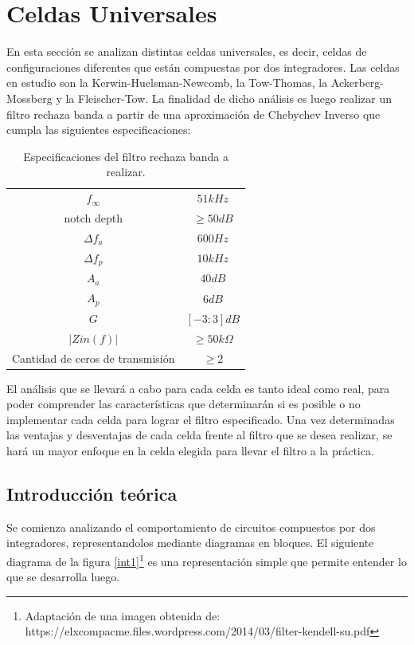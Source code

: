 \section{Celdas Universales}

En esta secci\'on se analizan distintas celdas universales, es decir, celdas de configuraciones diferentes que est\'an compuestas por dos integradores. Las celdas en estudio son la Kerwin-Huelsman-Newcomb, la Tow-Thomas, la Ackerberg-Mossberg y la Fleischer-Tow. La finalidad de dicho an\'alisis es luego realizar un filtro rechaza banda a partir de una aproximaci\'on de Chebychev Inverso que cumpla las siguientes especificaciones:

	\begin{table}[H]
	\centering
	\begin{tabular}{c c}
		\hline
		$f_\infty$ & $51kHz$ \\ 
		notch depth &  $\geq 50dB$\\
		$\Delta f_a$ & $600Hz$\\
		$\Delta f_p$ & $10kHz$\\
		$A_a$ & $40dB$\\
		$A_p$ & $6dB$\\
		$G$ & $[-3:3]dB$\\
		$|Zin(f)|$ & $\geq 50k\Omega$\\	
		Cantidad de ceros de transmisi\'on & $\geq 2$\\
		\hline
	\end{tabular}
	\caption{Especificaciones del filtro rechaza banda a realizar.}
	\label{especificaciones}
\end{table}

El an\'alisis que se llevar\'a a cabo para cada celda es tanto ideal como real, para poder comprender las caracter\'isticas que determinar\'an si es posible o no implementar cada celda para lograr el filtro especificado. Una vez determinadas las ventajas y desventajas de cada celda frente al filtro que se desea realizar, se har\'a un mayor enfoque en la celda elegida para llevar el filtro a la pr\'actica.


\subsection{Introducci\'on te\'orica}

Se comienza analizando el comportamiento de circuitos compuestos por dos integradores, representandolos mediante diagramas en bloques. El siguiente diagrama de la figura \ref{int1}\footnote{Adaptaci\'on de una imagen obtenida de: https://elxcompacme.files.wordpress.com/2014/03/filter-kendell-su.pdf} es una representaci\'on simple que permite entender lo que se desarrolla luego.

